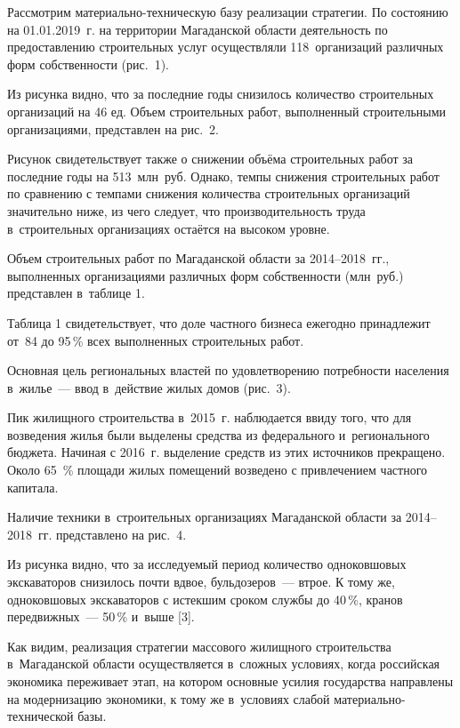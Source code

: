 Рассмотрим материально-техническую базу реализации стратегии. По состоянию на 01.01.2019~г. на территории Магаданской области деятельность по предоставлению строительных услуг осуществляли 118~организаций различных форм собственности (рис.~1).



Из рисунка видно, что за последние годы снизилось количество строительных организаций на 46 ед. Объем строительных работ, выполненный строительными организациями, представлен на рис.~2.



Рисунок свидетельствует также о снижении объёма строительных работ за последние годы на 513~млн~руб. Однако, темпы снижения строительных работ по сравнению с темпами снижения количества строительных организаций значительно ниже, из чего следует, что производительность труда в~строительных организациях остаётся на высоком уровне.

Объем строительных работ по Магаданской области за 2014--2018~гг., выполненных организациями различных форм собственности (млн~руб.) представлен в~таблице 1.



Таблица 1 свидетельствует, что доле частного бизнеса ежегодно принадлежит от~84 до 95\,\% всех выполненных строительных работ.

Основная цель региональных властей по удовлетворению потребности населения в~жилье~--- ввод в~действие жилых домов (рис.~3).



Пик жилищного строительства в~2015~г. наблюдается ввиду того, что для возведения жилья были выделены средства из федерального и~регионального бюджета. Начиная с 2016~г. выделение средств из этих источников прекращено. Около 65 \,\%  площади жилых помещений возведено с привлечением частного капитала.

Наличие техники в~строительных организациях Магаданской области за 2014--2018~гг. представлено на рис.~4.



Из рисунка видно, что за исследуемый период количество одноковшовых экскаваторов снизилось почти вдвое, бульдозеров~--- втрое. К тому же, одноковшовых экскаваторов с истекшим сроком службы до 40\,\%, кранов передвижных~--- 50\,\% и~выше [3].

Как видим, реализация стратегии массового жилищного строительства в~Магаданской области осуществляется в~сложных условиях, когда российская экономика переживает этап, на котором основные усилия государства направлены на модернизацию экономики, к тому же в~условиях слабой материально-технической базы.

